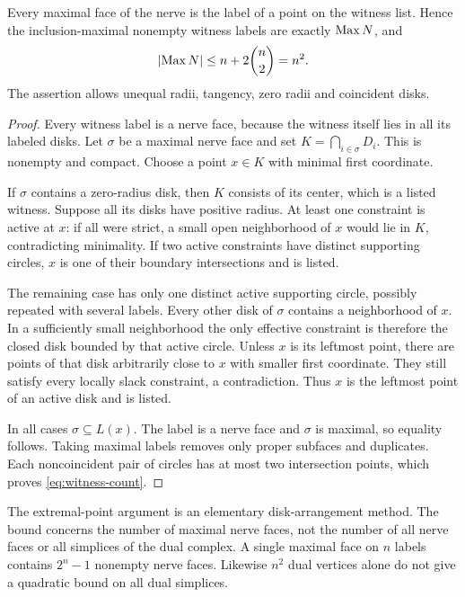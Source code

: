 \begin{theorem}\label{thm:witness}
Every maximal face of the nerve is the label of a point on the witness list. Hence the inclusion-maximal nonempty witness labels are exactly $\operatorname{Max} N$, and
\begin{equation}\label{eq:witness-count}
\left|\operatorname{Max} N\right|\le n+2\binom n2=n^2.
\end{equation}
The assertion allows unequal radii, tangency, zero radii and coincident disks.
\end{theorem}
\begin{proof}
Every witness label is a nerve face, because the witness itself lies in all its labeled disks. Let $\sigma$ be a maximal nerve face and set $K=\bigcap_{i\in\sigma}D_i$. This is nonempty and compact. Choose a point $x\in K$ with minimal first coordinate.

If $\sigma$ contains a zero-radius disk, then $K$ consists of its center, which is a listed witness. Suppose all its disks have positive radius. At least one constraint is active at $x$: if all were strict, a small open neighborhood of $x$ would lie in $K$, contradicting minimality. If two active constraints have distinct supporting circles, $x$ is one of their boundary intersections and is listed.

The remaining case has only one distinct active supporting circle, possibly repeated with several labels. Every other disk of $\sigma$ contains a neighborhood of $x$. In a sufficiently small neighborhood the only effective constraint is therefore the closed disk bounded by that active circle. Unless $x$ is its leftmost point, there are points of that disk arbitrarily close to $x$ with smaller first coordinate. They still satisfy every locally slack constraint, a contradiction. Thus $x$ is the leftmost point of an active disk and is listed.

In all cases $\sigma\subseteq L(x)$. The label is a nerve face and $\sigma$ is maximal, so equality follows. Taking maximal labels removes only proper subfaces and duplicates. Each noncoincident pair of circles has at most two intersection points, which proves \cref{eq:witness-count}.
\end{proof}

\begin{remark}
The extremal-point argument is an elementary disk-arrangement method. The bound concerns the number of maximal nerve faces, not the number of all nerve faces or all simplices of the dual complex. A single maximal face on $n$ labels contains $2^n-1$ nonempty nerve faces. Likewise $n^2$ dual vertices alone do not give a quadratic bound on all dual simplices.
\end{remark}

